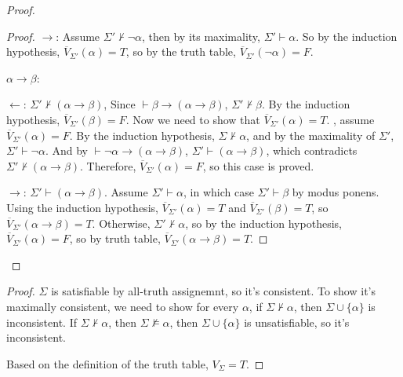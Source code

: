 \begin{proof}
\begin{proof}
$\rightarrow$:
Assume $\Sigma'\nvdash\neg\alpha$, then by its maximality, $\Sigma'\vdash\alpha$. So by the induction hypothesis, $\overline{V}_{\Sigma'}(\alpha)=T$, so by the truth table, $\overline{V}_{\Sigma'}(\neg\alpha)=F$.

$\alpha\rightarrow\beta$:

$\leftarrow$: $\Sigma'\nvdash(\alpha\rightarrow\beta)$,
Since $\vdash\beta\rightarrow(\alpha\rightarrow\beta)$, $\Sigma'\nvdash\beta$. 
By the induction hypothesis, $\overline{V}_{\Sigma'}(\beta)=F$.
Now we need to show that $\overline{V}_{\Sigma'}(\alpha)=T$. 
\bwoc, assume $\overline{V}_{\Sigma'}(\alpha)=F$.
By the induction hypothesis, $\Sigma\nvdash\alpha$, and by the maximality of $\Sigma'$, $\Sigma'\vdash\neg\alpha$. And by $\vdash\neg\alpha\rightarrow(\alpha\rightarrow\beta)$, $\Sigma'\vdash(\alpha\rightarrow\beta)$, which contradicts $\Sigma'\nvdash(\alpha\rightarrow\beta)$. Therefore, $\overline{V}_{\Sigma'}(\alpha)=F$, so this case is proved.

$\rightarrow$: $\Sigma'\vdash(\alpha\rightarrow\beta)$.
Assume $\Sigma'\vdash\alpha$, in which case $\Sigma'\vdash\beta$ by modus ponens. Using the induction hypothesis, $\overline{V}_{\Sigma'}(\alpha)=T$ and $\overline{V}_{\Sigma'}(\beta)=T$, so $\overline{V}_{\Sigma'}(\alpha\rightarrow\beta)=T$.
Otherwise, $\Sigma'\nvdash\alpha$, so by the induction hypothesis, $\overline{V}_{\Sigma'}(\alpha)=F$, so by truth table, $\overline{V}_{\Sigma'}(\alpha\rightarrow\beta)=T$.
\end{proof}
\end{proof}


\begin{proof}
$\Sigma$ is satisfiable by all-truth assignemnt, so it's consistent.
To show it's maximally consistent, we need to show for every $\alpha$, if $\Sigma\nvdash\alpha$, then $\Sigma\cup\{\alpha\}$ is inconsistent.
If $\Sigma\nvdash\alpha$, then $\Sigma\nvDash\alpha$, then $\Sigma\cup\{\alpha\}$ is unsatisfiable, so it's inconsistent.

Based on the definition of the truth table, $V_{\Sigma}=T$.

\end{proof}